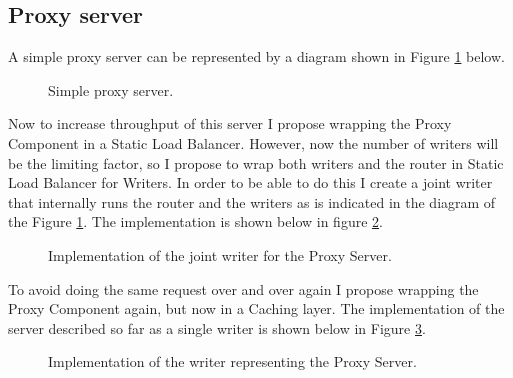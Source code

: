 \subsection{Proxy server}
A simple proxy server can be represented by a diagram shown in Figure
\ref{fig:proxyServer} below.
\begin{figure}[h]
\centering
{}
\caption[scale=1.0]{Simple proxy server.}
\label{fig:proxyServer}
\end{figure}

Now to increase throughput of this server I propose wrapping the Proxy
Component in a Static Load Balancer. However, now the number of writers
will be the limiting factor, so I propose to wrap both writers and 
the router in Static Load Balancer for Writers. In order to be able 
to do this I create a joint writer that internally runs the router and
the writers as is indicated in the diagram of the Figure \ref{fig:proxyServer}.
The implementation is shown below in figure \ref{fig:ProxyWriters}.
\begin{figure}[h]
  
\caption[scale=1.0]{Implementation of the joint writer for the Proxy Server.}
\label{fig:ProxyWriters}
\end{figure}

To avoid doing the same request over and over again I propose
wrapping the Proxy Component again, but now in a Caching layer. The 
implementation of the server described so far as a single writer is shown
below in Figure \ref{fig:ProxyWriter}.
\begin{figure}[h]
 
\caption[scale=1.0]{Implementation of the writer representing the Proxy Server.}
\label{fig:ProxyWriter}
\end{figure}


